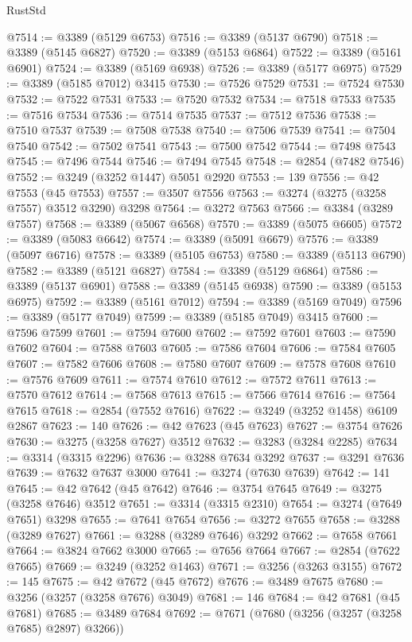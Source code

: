 \begin{lexlean}{RustStd}
\begin{coremodule}
@7514 := @3389 (@5129 @6753)
@7516 := @3389 (@5137 @6790)
@7518 := @3389 (@5145 @6827)
@7520 := @3389 (@5153 @6864)
@7522 := @3389 (@5161 @6901)
@7524 := @3389 (@5169 @6938)
@7526 := @3389 (@5177 @6975)
@7529 := @3389 (@5185 @7012) @3415
@7530 := @7526 @7529
@7531 := @7524 @7530
@7532 := @7522 @7531
@7533 := @7520 @7532
@7534 := @7518 @7533
@7535 := @7516 @7534
@7536 := @7514 @7535
@7537 := @7512 @7536
@7538 := @7510 @7537
@7539 := @7508 @7538
@7540 := @7506 @7539
@7541 := @7504 @7540
@7542 := @7502 @7541
@7543 := @7500 @7542
@7544 := @7498 @7543
@7545 := @7496 @7544
@7546 := @7494 @7545
@7548 := @2854 (@7482 @7546)
@7552 := @3249 (@3252 @1447) @5051 @2920
@7553 := 139
@7556 := @42 @7553 (@45 @7553)
@7557 := @3507 @7556
@7563 := @3274 (@3275 (@3258 @7557) @3512 @3290) @3298
@7564 := @3272 @7563
@7566 := @3384 (@3289 @7557)
@7568 := @3389 (@5067 @6568)
@7570 := @3389 (@5075 @6605)
@7572 := @3389 (@5083 @6642)
@7574 := @3389 (@5091 @6679)
@7576 := @3389 (@5097 @6716)
@7578 := @3389 (@5105 @6753)
@7580 := @3389 (@5113 @6790)
@7582 := @3389 (@5121 @6827)
@7584 := @3389 (@5129 @6864)
@7586 := @3389 (@5137 @6901)
@7588 := @3389 (@5145 @6938)
@7590 := @3389 (@5153 @6975)
@7592 := @3389 (@5161 @7012)
@7594 := @3389 (@5169 @7049)
@7596 := @3389 (@5177 @7049)
@7599 := @3389 (@5185 @7049) @3415
@7600 := @7596 @7599
@7601 := @7594 @7600
@7602 := @7592 @7601
@7603 := @7590 @7602
@7604 := @7588 @7603
@7605 := @7586 @7604
@7606 := @7584 @7605
@7607 := @7582 @7606
@7608 := @7580 @7607
@7609 := @7578 @7608
@7610 := @7576 @7609
@7611 := @7574 @7610
@7612 := @7572 @7611
@7613 := @7570 @7612
@7614 := @7568 @7613
@7615 := @7566 @7614
@7616 := @7564 @7615
@7618 := @2854 (@7552 @7616)
@7622 := @3249 (@3252 @1458) @6109 @2867
@7623 := 140
@7626 := @42 @7623 (@45 @7623)
@7627 := @3754 @7626
@7630 := @3275 (@3258 @7627) @3512
@7632 := @3283 (@3284 @2285)
@7634 := @3314 (@3315 @2296)
@7636 := @3288 @7634 @3292
@7637 := @3291 @7636
@7639 := @7632 @7637 @3000
@7641 := @3274 (@7630 @7639)
@7642 := 141
@7645 := @42 @7642 (@45 @7642)
@7646 := @3754 @7645
@7649 := @3275 (@3258 @7646) @3512
@7651 := @3314 (@3315 @2310)
@7654 := @3274 (@7649 @7651) @3298
@7655 := @7641 @7654
@7656 := @3272 @7655
@7658 := @3288 (@3289 @7627)
@7661 := @3288 (@3289 @7646) @3292
@7662 := @7658 @7661
@7664 := @3824 @7662 @3000
@7665 := @7656 @7664
@7667 := @2854 (@7622 @7665)
@7669 := @3249 (@3252 @1463)
@7671 := @3256 (@3263 @3155)
@7672 := 145
@7675 := @42 @7672 (@45 @7672)
@7676 := @3489 @7675
@7680 := @3256 (@3257 (@3258 @7676) @3049)
@7681 := 146
@7684 := @42 @7681 (@45 @7681)
@7685 := @3489 @7684
@7692 := @7671 (@7680 (@3256 (@3257 (@3258 @7685) @2897) @3266))

\end{coremodule}
\end{lexlean}
